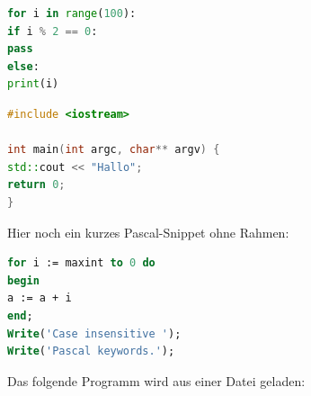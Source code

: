 \documentclass[a4paper,10pt,ngerman]{scrartcl}
\begin{document}
\lstset{language=Pascal}          %

\begin{lstlisting}[frame=single,language=Python,title=Kleines Python-Programm]
for i in range(100):
if i % 2 == 0:
pass
else:
print(i)
\end{lstlisting}

\begin{lstlisting}[frame=single,language=C++,title=Kleines C++-Programm]
#include <iostream>

int main(int argc, char** argv) {
std::cout << "Hallo";
return 0;
}
\end{lstlisting}

Hier noch ein kurzes Pascal-Snippet ohne Rahmen:
\begin{lstlisting}[language=Pascal]
for i := maxint to 0 do
begin
a := a + i
end;
Write('Case insensitive ');
Write('Pascal keywords.');
\end{lstlisting}

Das folgende Programm wird aus einer Datei geladen:

\end{document}
